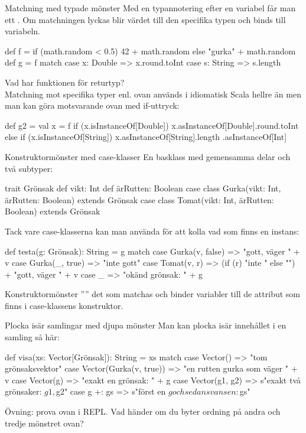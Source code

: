 \begin{Slide}{Matchning med typade mönster}\SlideFontSmall
Med en typannotering efter en variabel får man ett  . Om matchningen lyckas blir värdet  till den specifika typen och binds till variabeln.
\begin{Code}
def f = if (math.random < 0.5) 42 + math.random else "gurka" + math.random
def g = f match {
  case x: Double => x.round.toInt
  case s: String => s.length
}
\end{Code}
Vad har funktionen  för returtyp? \\ \pause
Matchning mot specifika typer enl. ovan används i idiomatisk Scala hellre än  men man kan göra motsvarande ovan med if-uttryck:
\begin{Code}
def g2 = {
  val x = f
  if (x.isInstanceOf[Double]) x.asInstanceOf[Double].round.toInt
  else if (x.isInstanceOf[String]) x.asInstanceOf[String].length
}.asInstanceOf[Int]
\end{Code}
\end{Slide}


\begin{Slide}{Konstruktormönster med case-klasser}\SlideFontSmall
En basklass med gemensamma delar och två subtyper:
\begin{Code}
trait Grönsak {
  def vikt: Int
  def ärRutten: Boolean
}
case class Gurka(vikt: Int, ärRutten: Boolean) extends Grönsak
case class Tomat(vikt: Int, ärRutten: Boolean) extends Grönsak
\end{Code}
\pause
Tack vare case-klasserna kan man använda   för att kolla vad som finns  en instans:
\begin{Code}
def testa(g: Grönsak): String = g match {
  case Gurka(v, false) => "gott, väger " + v
  case Gurka(_, true)  => "inte gott"
  case Tomat(v, r)     => (if (r) "inte " else "") + "gott, väger " + v
  case _ => "okänd grönsak: " + g
}
\end{Code}

Konstruktormönster '''' det som matchas och binder variabler till de attribut som finns i case-klassens konstruktor.
\end{Slide}


\begin{Slide}{Plocka isär samlingar med djupa mönster}
Man kan plocka isär innehållet i en samling så här:
\begin{Code}
def visa(xs: Vector[Grönsak]): String = xs match {
  case Vector()               => "tom grönsaksvektor"
  case Vector(Gurka(v, true)) => "en rutten gurka som väger " + v
  case Vector(g)              => "exakt en grönsak: " + g
  case Vector(g1, g2)         => s"exakt två grönsaker: $g1, $g2"
  case g +: gs                => s"först en $g och sedan svansen: $gs"
}
\end{Code}
Övning: prova ovan i REPL. Vad händer om du byter ordning på andra och tredje mönstret ovan?
\end{Slide}

